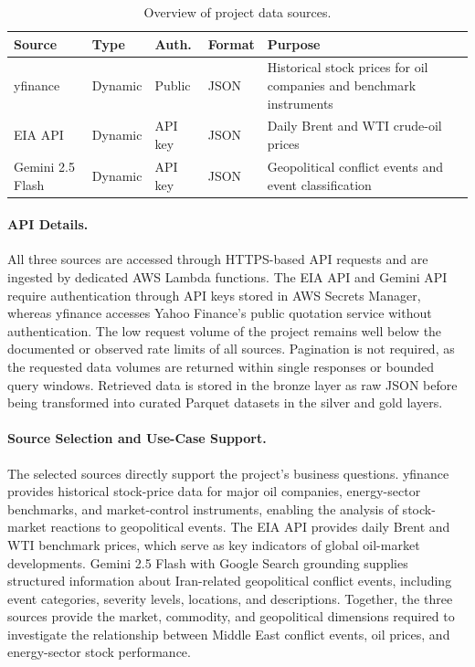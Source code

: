 \documentclass[11pt,a4paper]{article}
\begin{document}
\begin{table}[H]
\centering
\small
\begin{tabular}{p{2.8cm}p{1.5cm}p{1.8cm}p{1.5cm}p{5.5cm}}
\hline
\textbf{Source} & \textbf{Type} & \textbf{Auth.} & \textbf{Format} & \textbf{Purpose} \\
\hline
yfinance & Dynamic & Public & JSON & Historical stock prices for oil companies and benchmark instruments \\
EIA API & Dynamic & API key & JSON & Daily Brent and WTI crude-oil prices \\
Gemini 2.5 Flash & Dynamic & API key & JSON & Geopolitical conflict events and event classification \\
\hline
\end{tabular}
\caption{Overview of project data sources.}
\label{tab:data_sources}
\end{table}

\paragraph{API Details.}
All three sources are accessed through HTTPS-based API requests and are
ingested by dedicated AWS Lambda functions. The EIA API and Gemini API
require authentication through API keys stored in AWS Secrets Manager,
whereas yfinance accesses Yahoo Finance's public quotation service
without authentication. The low request volume of the project remains
well below the documented or observed rate limits of all sources.
Pagination is not required, as the requested data volumes are returned
within single responses or bounded query windows. Retrieved data is
stored in the bronze layer as raw JSON before being transformed into
curated Parquet datasets in the silver and gold layers.

\paragraph{Source Selection and Use-Case Support.}
The selected sources directly support the project's business questions.
yfinance provides historical stock-price data for major oil companies,
energy-sector benchmarks, and market-control instruments, enabling the
analysis of stock-market reactions to geopolitical events. The EIA API
provides daily Brent and WTI benchmark prices, which serve as key
indicators of global oil-market developments. Gemini 2.5 Flash with
Google Search grounding supplies structured information about
Iran-related geopolitical conflict events, including event categories,
severity levels, locations, and descriptions. Together, the three
sources provide the market, commodity, and geopolitical dimensions
required to investigate the relationship between Middle East conflict
events, oil prices, and energy-sector stock performance.
\end{document}
